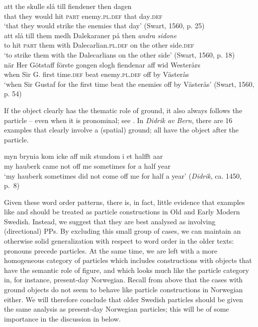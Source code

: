 \documentclass[output=paper]{langscibook}
\begin{document}
\ea\label{ex:lalu:26}
\ea\label{ex:lalu:26a}
\gll  att   the     skulle   slå   till   fiendener         then   dagen\\
    that   they   would   hit  \textsc{part}   enemy\textsc{.pl.def}   that   day\textsc{.def} \\
\glt `that they would strike the enemies that day’ (Swart, 1560, p. 25)\\

\ex\label{ex:lalu:26b}
\gll  att   slå   till   them   medh   Dalekaraner       på   then \textit{andra}   \textit{sidone}\\
    to     hit  \textsc{part}  them   with     Dalecarlian\textsc{.pl.def}   on   the other     side.\textsc{def}\\
\glt `to strike them with the Dalecarlians on the other side’ (Swart, 1560, p. 18)\\
\z
\ex\label{ex:lalu:27}
\gll  när    Her  Götstaff   förste    gongen   slogh   fiendenar aff   wid  Westerårs\\
when   Sir  G.       first     time.\textsc{def}   beat     enemy\textsc{.pl.def}  off   by   Västerås\\
\glt `when Sir Gustaf for the first time beat the enemies off by Västerås' (Swart, 1560, p. 54)\\
\z

If the object clearly has the thematic role of ground, it also always follows the particle – even when it is pronominal; see . In \textit{Didrik av Bern}, there are 16 examples that clearly involve a (spatial) ground; all have the object after the particle.


\ea\label{ex:lalu:28}
\gll  myn   brynia   kom   icke   aff   mik   stundom   i     et   halfft  aar\\
my     hauberk     came  not     off   me   sometimes   for   a   half   year \\
\glt `my hauberk sometimes did not come off me for half a year’ (\textit{Didrik}, ca. 1450, p.~8)\\
\z

Given these word order patterns, there is, in fact, little evidence that examples like  and  should be treated as particle constructions in Old and Early Modern Swedish. Instead, we suggest that they are best analysed as involving (directional) PPs. By excluding this small group of cases, we can maintain an otherwise solid generalization with respect to word order in the older texts: pronouns precede particles. At the same time, we are left with a more homogeneous category of particles which includes constructions with objects that have the semantic role of figure, and which looks much like the particle category in, for instance, present-day Norwegian. Recall from  above that the cases with ground objects do not seem to behave like particle constructions in Norwegian either. We will therefore conclude that older Swedish particles should be given the same analysis as present-day Norwegian particles; this will be of some importance in the discussion in  below.
\end{document}
